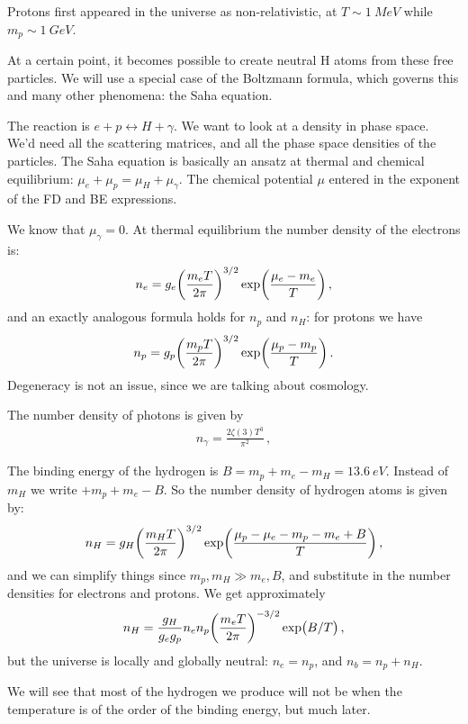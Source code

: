 \documentclass[main.tex]{subfiles}
\begin{document}
Protons first appeared in the universe as non-relativistic, at \(T \sim \SI{1}{MeV}\) while \(m_p \sim \SI{1}{GeV}\).

At a certain point, it becomes possible to create neutral H atoms from these free particles.
We will use a special case of the Boltzmann formula, which governs this and many other phenomena: the Saha equation.

The reaction is \(e + p \leftrightarrow H + \gamma \). We want to look at a density in phase space.
We'd need all the scattering matrices, and all the phase space densities of the particles.
The Saha equation is basically an ansatz at thermal and chemical equilibrium: \(\mu _e + \mu_p = \mu_H + \mu_\gamma \). The chemical potential \(\mu \) entered in the exponent of the FD and BE expressions.

We know that \(\mu_{\gamma }=0\).
At thermal equilibrium the number density of the electrons is: 
%
\begin{align}
  n_e = g_e \qty(\frac{m_e T}{2 \pi })^{3/2} \exp(\frac{\mu _e - m_e }{T}) 
\,,
\end{align}
%
and an exactly analogous formula holds for \(n_p\) and \(n_H\): for protons we have 
%
\begin{align}
    n_p = g_p \qty(\frac{m_p T}{2 \pi })^{3/2} \exp(\frac{\mu _p - m_p }{T}) 
  \,.
\end{align}
Degeneracy is not an issue, since we are talking about cosmology.

The number density of photons is given by 
%
\begin{align} \label{eq:n-gamma}
  n_{\gamma } = \frac{2 \zeta (3) T^3}{\pi^2}
\,,
\end{align}
%

The binding energy of the hydrogen is \(B=m_p+m_e-m_H=\SI{13.6}{eV}\). Instead of \(m_H\) we write \(+m_p+m_e-B\). So the number density of hydrogen atoms is given by: 
%
\begin{align}
  n_H = g_H \qty(\frac{m_H T}{2 \pi })^{3/2} \exp(\frac{\mu_p - \mu_e - m_p - m_e + B}{T})
\,,
\end{align}
%
and we can simplify things since \(m_p, m_H \gg m_e, B\), and substitute in the number densities for electrons and protons.
We get approximately
%
\begin{align}
  n_H = \frac{g_H}{g_e g_p} n_e n_p \qty(\frac{m_e T}{2 \pi })^{-3/2}\exp(B/T)
\,,
\end{align}
%
but the universe is locally and globally neutral: \(n_e = n_p\), and \(n_b = n_p + n_H\). 

We will see that most of the hydrogen we produce will not be when the temperature is of the order of the binding energy, but much later.
\end{document}

